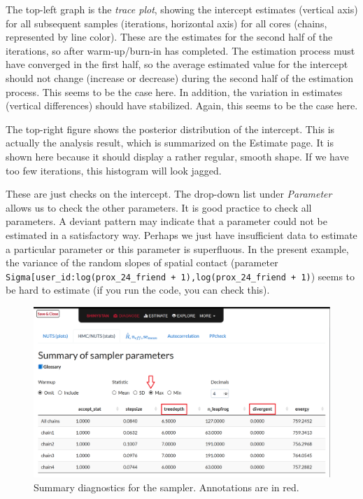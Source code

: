 \documentclass[
  english,
  doc]{apa6}
\begin{document}
The top-left graph is the \emph{trace plot}, showing the intercept estimates (vertical axis) for all subsequent samples (iterations, horizontal axis) for all cores (chains, represented by line color). These are the estimates for the second half of the iterations, so after warm-up/burn-in has completed. The estimation process must have converged in the first half, so the average estimated value for the intercept should not change (increase or decrease) during the second half of the estimation process. This seems to be the case here. In addition, the variation in estimates (vertical differences) should have stabilized. Again, this seems to be the case here.

The top-right figure shows the posterior distribution of the intercept. This is actually the analysis result, which is summarized on the Estimate page. It is shown here because it should display a rather regular, smooth shape. If we have too few iterations, this histogram will look jagged.

These are just checks on the intercept. The drop-down list under \emph{Parameter} allows us to check the other parameters. It is good practice to check all parameters. A deviant pattern may indicate that a parameter could not be estimated in a satisfactory way. Perhaps we just have insufficient data to estimate a particular parameter or this parameter is superfluous. In the present example, the variance of the random slopes of spatial contact (parameter \texttt{Sigma{[}user\_id:log(prox\_24\_friend\ +\ 1),log(prox\_24\_friend\ +\ 1)}) seems to be hard to estimate (if you run the code, you can check this).

\begin{figure}[H]
\includegraphics[width=1\linewidth]{shinystan2} \caption{Summary diagnostics for the sampler. Annotations are in red.}\label{fig:shinystanshot2}
\end{figure}
\end{document}
